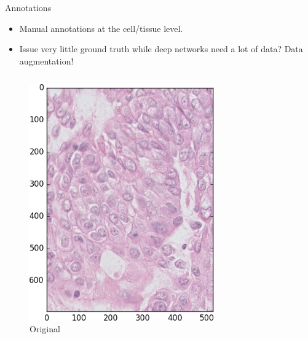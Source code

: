 \documentclass{beamer}
\begin{document}
\begin{frame}{Annotations}
\begin{itemize}
\item Manual annotations at the cell/tissue level.
\item Issue very little ground truth while deep networks need a lot of data? Data augmentation! \\
\end{itemize}

\begin{columns}[T] %
\begin{column}{.16\textwidth}
\begin{figure}[!ht]
\centering
\includegraphics[width=0.9\textwidth]{BIS.png}\par 
\caption{Original}
\label{fig: ori}
\end{figure}
\end{column}%
\begin{column}{.16\textwidth}
\begin{figure}[!ht]
\centering

\end{figure}
\end{column}
\end{columns}
\end{frame}
\end{document}
